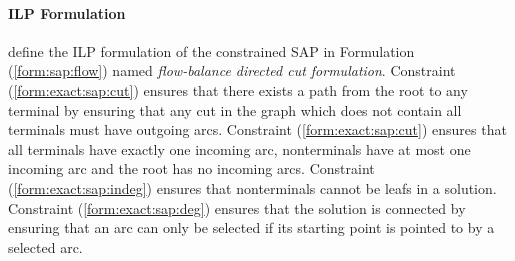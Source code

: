  \paragraph{ILP Formulation}
 \cite{gamrath2017scip} define the ILP formulation of the constrained SAP in Formulation (\ref{form:sap:flow})
 named \textit{flow-balance directed cut formulation}. Constraint (\ref{form:exact:sap:cut}) ensures that there exists a
  path from the root to any terminal by ensuring that any
 cut in the graph which does not contain all terminals must have outgoing arcs. Constraint (\ref{form:exact:sap:cut})
 ensures that all terminals have exactly one incoming arc, nonterminals have at most one incoming arc and the root has
 no incoming arcs. Constraint (\ref{form:exact:sap:indeg}) ensures that nonterminals cannot be leafs in a solution.
 Constraint (\ref{form:exact:sap:deg}) ensures that the solution is connected by ensuring that an arc can only be selected
 if its starting point is pointed to by a selected arc.

